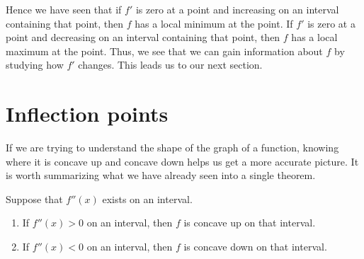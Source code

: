 \documentclass{ximera}
\begin{document}
\begin{example}
\begin{explanation}
\begin{image}
\end{image}
\end{explanation}
\end{example}


Hence we have seen that if $f'$ is zero at a point and increasing on an interval containing that  point,
then $f$ has a local minimum at the point. If $f'$ is zero at a point and
decreasing on an interval containing that point, then $f$ has a local maximum at the
point. Thus, we see that we can gain information about $f$ by
studying how $f'$ changes. This leads us to our next section.








\section{Inflection points}


If we are trying to understand the shape of the graph of a function,
knowing where it is concave up and concave down helps us  get a more
accurate picture. It is worth summarizing what we have already seen into
 a single theorem.

\begin{theorem}
Suppose that $f''(x)$ exists on an interval.
\begin{enumerate}
\item If $f''(x)>0$ on an interval, then $f$ is concave up on that interval.
\item If $f''(x)<0$ on an interval, then $f$ is concave down on that interval.
\end{enumerate}
\end{theorem}
\end{document}
